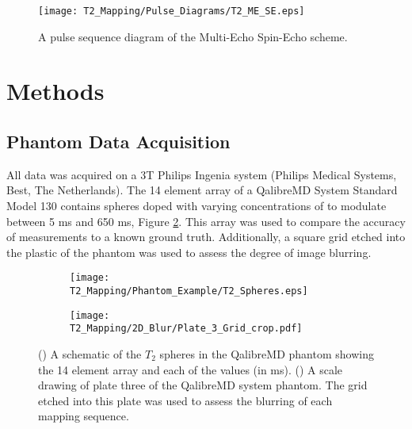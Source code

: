 \begin{figure}[H]
	\centering
	\texttt{[image: T2\_Mapping/Pulse\_Diagrams/T2\_ME\_SE.eps]}
	\caption{A pulse sequence diagram of the Multi-Echo Spin-Echo scheme.}
	\label{fig:t2_me-se_seq}	
\end{figure}

\newpage

\section{Methods}
\label{sec:t2_methods}

\subsection{Phantom Data Acquisition}

All data was acquired on a 3T Philips Ingenia system (Philips Medical Systems, Best, The Netherlands). The 14 element \ttwo array of a QalibreMD System Standard Model 130 contains spheres doped with varying concentrations of  to modulate \ttwo between 5 ms and 650 ms, Figure \ref{fig:t2_phantom_schematic}. This array was used to compare the accuracy of \ttwo measurements to a known ground truth. Additionally, a square grid etched into the plastic of the phantom was used to assess the degree of image blurring. 

\begin{figure}[H]
\centering
\begin{subfigure}[c]{0.47\textwidth}
	\centering
	\texttt{[image: T2\_Mapping/Phantom\_Example/T2\_Spheres.eps]}
	\caption{}
	\label{fig:t2_phantom_schematic}
\end{subfigure}
\hfill
\begin{subfigure}[c]{0.47\textwidth}
	\centering
	\texttt{[image: T2\_Mapping/2D\_Blur/Plate\_3\_Grid\_crop.pdf]}
	\caption{}
	\label{fig:t2_blur_grid}
\end{subfigure}
\caption{() A schematic of the $T_2$ spheres in the QalibreMD phantom showing the 14 element \ttwo array and each of the \ttwo values (in ms). () A scale drawing of plate three of the QalibreMD system phantom. The grid etched into this plate was used to assess the blurring of each \ttwo mapping sequence.}
\label{fig:t2_nist_phantom}
\end{figure}

